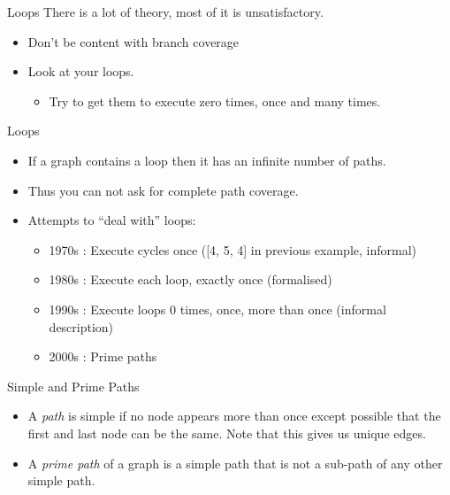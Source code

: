 \documentclass[handout]{beamer}
\newcommand{\recordingpause}{
\begin{frame}{Recording Pause}
  \begin{center}
    Recording Pause
  \end{center}
\end{frame}
}
\renewcommand{\recordingpause}{}
\begin{document}
\begin{frame}{Loops}
There is a lot of theory, most of it is unsatisfactory. 
  \begin{itemize}
  \item Don't be content with branch coverage
  \item Look at your loops.
    \begin{itemize}
    \item Try to get them to execute zero times, once and many times.
    \end{itemize}
  \end{itemize}
\end{frame}
  \begin{frame}{Loops}
    \begin{itemize}
      
  \item If a graph contains a loop then it has an infinite number of
    paths.
  \item Thus you can not ask for complete path coverage. 
  \item Attempts to “deal with” loops:
    \begin{itemize}
    \item 1970s : Execute cycles once  ([4, 5, 4] in previous example, informal)
    \item 1980s : Execute each loop, exactly once (formalised)
    \item 1990s : Execute loops 0 times, once, more than once (informal description)
    \item 2000s : Prime paths
\end{itemize}
  \end{itemize}
  
\end{frame}
\recordingpause 
\begin{frame}{Simple and Prime Paths}
  \begin{itemize}
  \item A {\it path} is simple if no node appears more than once except
    possible that the first and last node can be the same. Note that this
    gives us unique edges.
  \item A {\it prime path} of a graph is a simple path that is not a
    sub-path of any other simple path.
  \end{itemize}
  
\end{frame}
\end{document}
